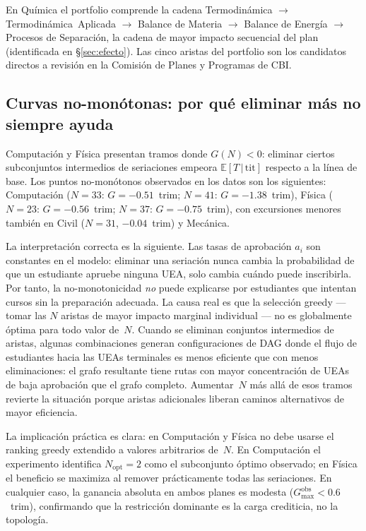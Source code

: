 \documentclass[11pt,letterpaper]{article}
\newcommand{\ETtit}{\mathbb{E}[T\,|\,\mathrm{tit}]}
\begin{document}
En Química el portfolio comprende la cadena
Termodinámica $\to$ Termodinámica~Aplicada $\to$ Balance de Materia $\to$ Balance de Energía
$\to$ Procesos de Separación, la cadena de mayor impacto secuencial del plan
(identificada en \S\ref{sec:efecto}).
Las cinco aristas del portfolio son los candidatos directos a revisión en la
Comisión de Planes y Programas de CBI.

\subsection{Curvas no-monótonas: por qué eliminar más no siempre ayuda}
\label{sec:nomonotona}

Computación y Física presentan tramos donde $G(N) < 0$: eliminar ciertos
subconjuntos intermedios de seriaciones empeora $\ETtit$ respecto a la línea
de base.
Los puntos no-monótonos observados en los datos son los siguientes:
Computación ($N = 33$: $G = -0.51$~trim; $N = 41$: $G = -1.38$~trim),
Física ($N = 23$: $G = -0.56$~trim; $N = 37$: $G = -0.75$~trim),
con excursiones menores también en Civil ($N = 31$, $-0.04$~trim) y Mecánica.

La interpretación correcta es la siguiente.
Las tasas de aprobación $a_i$ son constantes en el modelo: eliminar una
seriación nunca cambia la probabilidad de que un estudiante apruebe ninguna
UEA, solo cambia cuándo puede inscribirla.
Por tanto, la no-monotonicidad \emph{no} puede explicarse por estudiantes que
intentan cursos sin la preparación adecuada.
La causa real es que la selección greedy --- tomar las $N$ aristas de mayor
impacto marginal individual --- no es globalmente óptima para todo valor de~$N$.
Cuando se eliminan conjuntos intermedios de aristas, algunas combinaciones
generan configuraciones de DAG donde el flujo de estudiantes hacia las UEAs
terminales es menos eficiente que con menos eliminaciones: el grafo resultante
tiene rutas con mayor concentración de UEAs de baja aprobación que el grafo
completo.
Aumentar~$N$ más allá de esos tramos revierte la situación porque aristas
adicionales liberan caminos alternativos de mayor eficiencia.

La implicación práctica es clara: en Computación y Física no debe usarse el
ranking greedy extendido a valores arbitrarios de~$N$.
En Computación el experimento identifica $N_{\mathrm{opt}} = 2$ como el
subconjunto óptimo observado; en Física el beneficio se maximiza al remover
prácticamente todas las seriaciones.
En cualquier caso, la ganancia absoluta en ambos planes es modesta
($G_{\max}^{\mathrm{obs}} < 0.6$~trim), confirmando que la restricción
dominante es la carga crediticia, no la topología.
\end{document}
